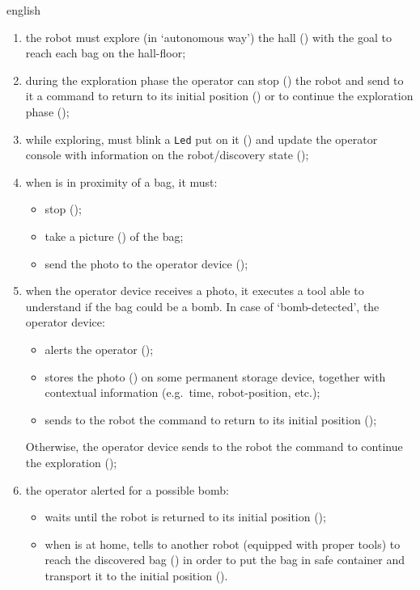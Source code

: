 \begin{foreigndisplayquote}{english}
  \begin{enumerate}
    \item
      the robot must explore (in `autonomous way') the hall () with the goal to reach each bag on the hall-floor;
    \item
      during the exploration phase the operator can stop () the robot and send to it a command to return to its initial position () or to continue the exploration phase ();
    \item
      while exploring,  must blink a \texttt{Led} put on it () and update the operator console with information on the robot/discovery state ();
    \item
      when  is in proximity of a bag, it must:
      \begin{itemize}
        \item stop ();
        \item take a picture () of the bag;
        \item send the photo to the operator device ();
      \end{itemize}
    \item
        when the operator device receives a photo, it executes a tool able to understand if the bag could be a bomb.
        In case of `bomb-detected', the operator device:
        \begin{itemize}
          \item alerts the operator ();
          \item stores the photo () on some permanent storage device, together with contextual information (e.g.\ time, robot-position, etc.);
          \item sends to the robot the command to return to its initial position ();
        \end{itemize}
        Otherwise, the operator device sends to the robot the command to continue the exploration ();
    \item
      the operator alerted for a possible bomb:
      \begin{itemize}
        \item waits until the robot is returned to its initial position ();
        \item when  is at home, tells to \hypertarget{ref:retriever}{another robot} (equipped with proper tools) to reach the discovered bag () in order to put the bag in safe container and transport it to the initial position ().
      \end{itemize}
  \end{enumerate}
\end{foreigndisplayquote}
